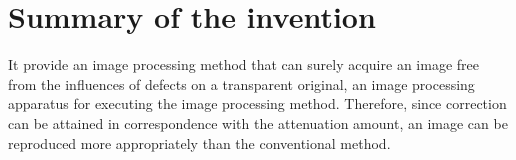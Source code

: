 \documentclass[10pt,twocolumn,letterpaper]{article}
\begin{document}
\section{Summary of the invention}
 It provide an image processing method that can surely acquire an image free from the influences of defects on a transparent original, an image processing apparatus for executing the image processing method. Therefore, since correction can be attained in correspondence with the attenuation amount, an image can be reproduced more appropriately than the conventional method.
{\small


}
\end{document}
